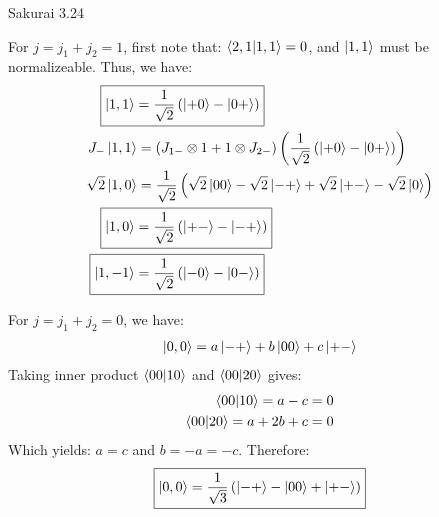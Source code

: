 \documentclass{article}
\begin{document}
\begin{section}{Sakurai 3.24}
\begin{tcolorbox}[breakable]
	For $j = j_1 + j_2 = 1$, first note that: $\bra{2,1}\ket{1,1} = 0$, and $\ket{1,1}$ must be normalizeable. Thus, we have:
	\begin{align*}
		\Aboxed{\ket{1,1}  & = \frac{1}{\sqrt{2}} \left( \ket{+0} - \ket{0+} \right)}                                                         \\
		J_- \ket{1,1}      & = (J_{1-} \otimes 1 + 1 \otimes J_{2-}) \left( \frac{1}{\sqrt{2}} \left( \ket{+0} - \ket{0+} \right) \right)     \\
		\sqrt{2} \ket{1,0} & = \frac{1}{\sqrt{2}} \left( \sqrt{2} \ket{00} - \sqrt{2} \ket{-+} + \sqrt{2} \ket{+-} - \sqrt{2} \ket{0} \right) \\
		\Aboxed{\ket{1,0}  & = \frac{1}{\sqrt{2}} \left( \ket{+-} - \ket{-+} \right)}                                                         \\
		\Aboxed{\ket{1,-1} & = \frac{1}{\sqrt{2}} \left( \ket{-0} - \ket{0-} \right)}
	\end{align*}

	For $j = j_1 + j_2 = 0$, we have:
	\begin{align*}
		\ket{0,0} & = a \ket{-+} + b \ket{00} + c \ket{+-} \\
	\end{align*}
	Taking inner product $\bra{00}\ket{10}$ and $\bra{00}\ket{20}$ gives:
	\begin{align*}
		\bra{00}\ket{10} = a - c = 0 \\
		\bra{00}\ket{20} = a+2b+c = 0
	\end{align*}
	Which yields: $a = c$ and $b=-a=-c$. Therefore:
	\begin{align*}
		\Aboxed{\ket{0,0} & = \frac{1}{\sqrt{3}} \left( \ket{-+} - \ket{00} + \ket{+-} \right)} \\
	\end{align*}
\end{tcolorbox}
\end{section}
\end{document}
